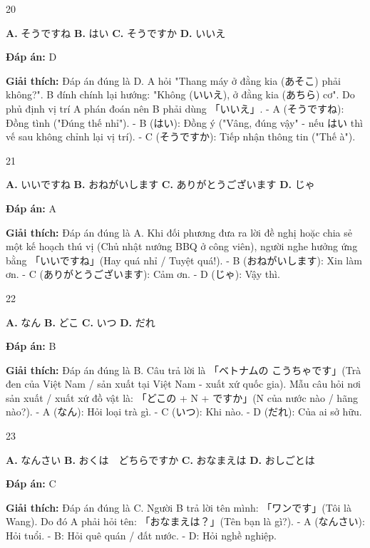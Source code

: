 \documentclass[12pt,a4paper]{report}
\newcommand{\source}[1]{}
\newcommand{\choice}[2]{\textbf{#1.} #2 \quad}
\newcommand{\answer}[1]{\par\textbf{Đáp án:} #1}
\newcommand{\confidence}[1]{}
\newcommand{\explain}[1]{\par\textbf{Giải thích:} #1\vspace{0.5cm}}
\begin{document}
\begin{question}{20}
\source{25.webp}
\choice{A}{そうですね}
\choice{B}{はい}
\choice{C}{そうですか}
\choice{D}{いいえ}
\answer{D}
\confidence{high}
\explain{Đáp án đúng là D. A hỏi "Thang máy ở đằng kia (あそこ) phải không?". B đính chính lại hướng: "Không (いいえ), ở đằng kia (あちら) cơ". Do phủ định vị trí A phán đoán nên B phải dùng 「いいえ」.
- A (そうですね): Đồng tình ("Đúng thế nhỉ").
- B (はい): Đồng ý ("Vâng, đúng vậy" - nếu はい thì vế sau không chỉnh lại vị trí).
- C (そうですか): Tiếp nhận thông tin ("Thế à").}
\end{question}

\begin{question}{21}
\source{26.webp}
\choice{A}{いいですね}
\choice{B}{おねがいします}
\choice{C}{ありがとうございます}
\choice{D}{じゃ}
\answer{A}
\confidence{high}
\explain{Đáp án đúng là A. Khi đối phương đưa ra lời đề nghị hoặc chia sẻ một kế hoạch thú vị (Chủ nhật nướng BBQ ở công viên), người nghe hưởng ứng bằng 「いいですね」(Hay quá nhỉ / Tuyệt quá!).
- B (おねがいします): Xin làm ơn.
- C (ありがとうございます): Cảm ơn.
- D (じゃ): Vậy thì.}
\end{question}

\begin{question}{22}
\source{Q10.jpg}
\choice{A}{なん}
\choice{B}{どこ}
\choice{C}{いつ}
\choice{D}{だれ}
\answer{B}
\confidence{high}
\explain{Đáp án đúng là B. Câu trả lời là 「ベトナムの こうちゃです」(Trà đen của Việt Nam / sản xuất tại Việt Nam - xuất xứ quốc gia). Mẫu câu hỏi nơi sản xuất / xuất xứ đồ vật là: 「どこの + N + ですか」(N của nước nào / hãng nào?).
- A (なん): Hỏi loại trà gì.
- C (いつ): Khi nào.
- D (だれ): Của ai sở hữu.}
\end{question}

\begin{question}{23}
\source{Q12.jpg}
\choice{A}{なんさい}
\choice{B}{おくは　どちらですか}
\choice{C}{おなまえは}
\choice{D}{おしごとは}
\answer{C}
\confidence{high}
\explain{Đáp án đúng là C. Người B trả lời tên mình: 「ワンです」(Tôi là Wang). Do đó A phải hỏi tên: 「おなまえは？」(Tên bạn là gì?).
- A (なんさい): Hỏi tuổi.
- B: Hỏi quê quán / đất nước.
- D: Hỏi nghề nghiệp.}
\end{question}
\end{document}
